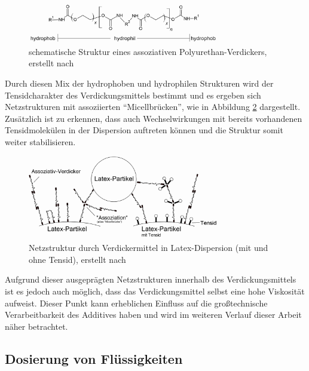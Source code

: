 \begin{figure}[h!]
	\centering
	\includegraphics[width=0.75\textwidth]{img/verdicker_struktur}
	\caption{schematische Struktur eines assoziativen Polyurethan-Verdickers, \linebreak erstellt nach \cite{Brock.2009}}
	\label{fig:struktur_puverdicker}
\end{figure}
\FloatBarrier

Durch diesen Mix der hydrophoben und hydrophilen Strukturen wird der Tensidcharakter des Verdickungsmittels bestimmt und es ergeben sich Netzstrukturen mit assoziierten "`Micellbrücken"', wie in Abbildung \ref{fig: verdicker_anwendung} dargestellt. Zusätzlich ist zu erkennen, dass auch Wechselwirkungen mit bereits vorhandenen Tensidmolekülen in der Dispersion auftreten können und die Struktur somit weiter stabilisieren. \cite{Mezger.2016}

\begin{figure}[h!]
	\centering
	\includegraphics[width=0.75\textwidth]{img/verdicker_anwendung}
	\caption{Netzstruktur durch Verdickermittel in Latex-Dispersion (mit und ohne Tensid), \linebreak erstellt nach \cite{Mezger.2016}}
	\label{fig: verdicker_anwendung}
\end{figure}
\FloatBarrier

Aufgrund dieser ausgeprägten Netzstrukturen innerhalb des Verdickungsmittels ist es jedoch auch möglich, dass das Verdickungsmittel selbst eine hohe Viskosität aufweist. Dieser Punkt kann erheblichen Einfluss auf die großtechnische Verarbeitbarkeit des Additives haben und wird im weiteren Verlauf dieser Arbeit näher betrachtet. 

\subsection{Dosierung von Flüssigkeiten}

